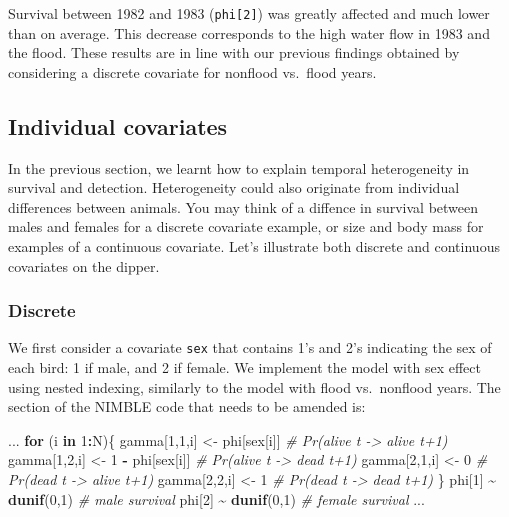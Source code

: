 \documentclass[
  12pt,
]{krantz}
\newenvironment{Shaded}{\begin{snugshade}}{\end{snugshade}}
\newcommand{\CommentTok}[1]{\textcolor[rgb]{0.56,0.35,0.01}{\textit{#1}}}
\newcommand{\ControlFlowTok}[1]{\textcolor[rgb]{0.13,0.29,0.53}{\textbf{#1}}}
\newcommand{\DecValTok}[1]{\textcolor[rgb]{0.00,0.00,0.81}{#1}}
\newcommand{\FunctionTok}[1]{\textcolor[rgb]{0.13,0.29,0.53}{\textbf{#1}}}
\newcommand{\NormalTok}[1]{#1}
\newcommand{\OtherTok}[1]{\textcolor[rgb]{0.56,0.35,0.01}{#1}}
\newcommand{\SpecialCharTok}[1]{\textcolor[rgb]{0.81,0.36,0.00}{\textbf{#1}}}
\begin{document}
Survival between 1982 and 1983 (\texttt{phi{[}2{]}}) was greatly affected and much lower than on average. This decrease corresponds to the high water flow in 1983 and the flood. These results are in line with our previous findings obtained by considering a discrete covariate for nonflood vs.~flood years.

\subsection{Individual covariates}\label{individual-covariates}

In the previous section, we learnt how to explain temporal heterogeneity in survival and detection. Heterogeneity could also originate from individual differences between animals. You may think of a diffence in survival between males and females for a discrete covariate example, or size and body mass for examples of a continuous covariate. Let's illustrate both discrete and continuous covariates on the dipper.

\subsubsection{Discrete}\label{discrete-1}

We first consider a covariate \texttt{sex} that contains 1's and 2's indicating the sex of each bird: 1 if male, and 2 if female. We implement the model with sex effect using nested indexing, similarly to the model with flood vs.~nonflood years. The section of the NIMBLE code that needs to be amended is:

\begin{Shaded}
\begin{Highlighting}[]
\NormalTok{...}
\ControlFlowTok{for}\NormalTok{ (i }\ControlFlowTok{in} \DecValTok{1}\SpecialCharTok{:}\NormalTok{N)\{}
\NormalTok{  gamma[}\DecValTok{1}\NormalTok{,}\DecValTok{1}\NormalTok{,i] }\OtherTok{\textless{}{-}}\NormalTok{ phi[sex[i]]      }\CommentTok{\# Pr(alive t {-}\textgreater{} alive t+1)}
\NormalTok{  gamma[}\DecValTok{1}\NormalTok{,}\DecValTok{2}\NormalTok{,i] }\OtherTok{\textless{}{-}} \DecValTok{1} \SpecialCharTok{{-}}\NormalTok{ phi[sex[i]]  }\CommentTok{\# Pr(alive t {-}\textgreater{} dead t+1)}
\NormalTok{  gamma[}\DecValTok{2}\NormalTok{,}\DecValTok{1}\NormalTok{,i] }\OtherTok{\textless{}{-}} \DecValTok{0}                \CommentTok{\# Pr(dead t {-}\textgreater{} alive t+1)}
\NormalTok{  gamma[}\DecValTok{2}\NormalTok{,}\DecValTok{2}\NormalTok{,i] }\OtherTok{\textless{}{-}} \DecValTok{1}                \CommentTok{\# Pr(dead t {-}\textgreater{} dead t+1)}
\NormalTok{\}}
\NormalTok{phi[}\DecValTok{1}\NormalTok{] }\SpecialCharTok{\textasciitilde{}} \FunctionTok{dunif}\NormalTok{(}\DecValTok{0}\NormalTok{,}\DecValTok{1}\NormalTok{) }\CommentTok{\# male survival}
\NormalTok{phi[}\DecValTok{2}\NormalTok{] }\SpecialCharTok{\textasciitilde{}} \FunctionTok{dunif}\NormalTok{(}\DecValTok{0}\NormalTok{,}\DecValTok{1}\NormalTok{) }\CommentTok{\# female survival}
\NormalTok{...}
\end{Highlighting}
\end{Shaded}
\end{document}
